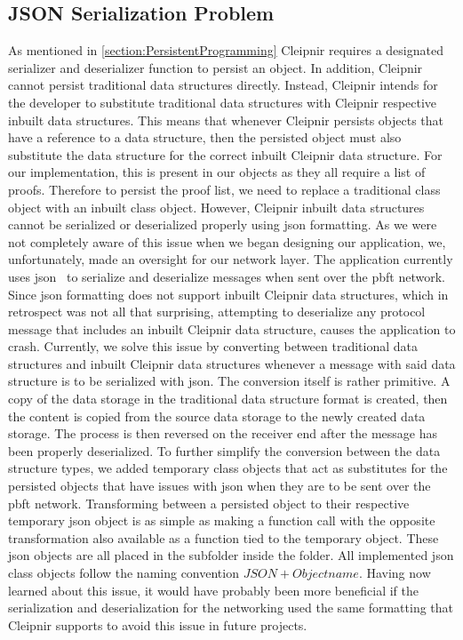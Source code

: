 \subsection{JSON Serialization Problem}
As mentioned in \autoref{section:PersistentProgramming} Cleipnir requires a designated serializer and deserializer function to persist an object. In addition, Cleipnir cannot persist traditional data structures directly. Instead, Cleipnir intends for the developer to substitute traditional data structures with Cleipnir respective inbuilt data structures. This means that whenever Cleipnir persists objects that have a reference to a data structure, then the persisted object must also substitute the data structure for the correct inbuilt Cleipnir data structure. For our implementation, this is present in our  objects as they all require a list of proofs. Therefore to persist the proof list, we need to replace a traditional  class object with an inbuilt  class object. However, Cleipnir inbuilt data structures cannot be serialized or deserialized properly using \ac{json} formatting.
As we were not completely aware of this issue when we began designing our application, we, unfortunately, made an oversight for our network layer. The application currently uses \ac{json}~\cite{WEB:NewJSON} to serialize and deserialize messages when sent over the \ac{pbft} network. Since \ac{json} formatting does not support inbuilt Cleipnir data structures, which in retrospect was not all that surprising, attempting to deserialize any protocol message that includes an inbuilt Cleipnir data structure, causes the application to crash. Currently, we solve this issue by converting between traditional data structures and inbuilt Cleipnir data structures whenever a message with said data structure is to be serialized with \ac{json}. The conversion itself is rather primitive. A copy of the data storage in the traditional data structure format is created, then the content is copied from the source data storage to the newly created data storage. The process is then reversed on the receiver end after the message has been properly deserialized. To further simplify the conversion between the data structure types, we added temporary  class objects that act as substitutes for the persisted objects that have issues with \ac{json} when they are to be sent over the \ac{pbft} network. Transforming between a persisted object to their respective temporary \ac{json} object is as simple as making a function call with the opposite transformation also available as a function tied to the temporary object. These \ac{json} objects are all placed in the subfolder  inside the  folder. All implemented \ac{json} class objects follow the naming convention $JSON + Objectname$. Having now learned about this issue, it would have probably been more beneficial if the serialization and deserialization for the networking used the same formatting that Cleipnir supports to avoid this issue in future projects.

